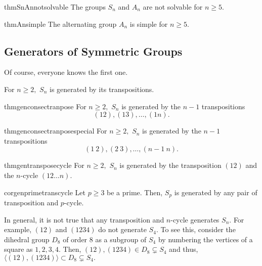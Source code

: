 \begin{restatable}[]{thm}{SnAnnotsolvable}
\label{thm:SnAnnotsolvable}
	The groups $S_n$ and $A_n$ are not solvable for $n \ge 5.$ \hfill\hyperref[thm:SnAnnotsolvable2]{\downsym}
\end{restatable}

\begin{restatable}[]{thm}{Ansimple}
\label{thm:Ansimple}
	The alternating group $A_n$ is simple for $n \ge 5.$ \hfill\hyperref[thm:Ansimple2]{\downsym}
\end{restatable}

\subsection{Generators of Symmetric Groups}

Of course, everyone knows the first one.

\begin{thm} \label{thm:gentranspose}
	For $n \ge 2,$ $S_n$ is generated by its transpositions.
\end{thm}

\begin{restatable}[]{thm}{genconsectranpose}
\label{thm:genconsectranpose}
	For $n \ge 2,$ $S_n$ is generated by the $n - 1$ transpositions
	\begin{equation*} 
		(12), (13), \ldots, (1n).
	\end{equation*} \hfill\hyperref[thm:genconsectranpose2]{\downsym}
\end{restatable}

\begin{restatable}[]{thm}{genconsectranposespecial}
\label{thm:genconsectranposespecial}
	For $n \ge 2,$ $S_n$ is generated by the $n - 1$ transpositions
	\begin{equation*} 
		(1 \ 2), (2 \ 3), \ldots, (n - 1 \ n).
	\end{equation*}  \hfill\hyperref[thm:genconsectranposespecial2]{\downsym}
\end{restatable}

\begin{restatable}[]{thm}{gentransposecycle}
\label{thm:gentransposecycle}
	For $n \ge 2,$ $S_n$ is generated by the transposition $(12)$ and the $n$-cycle $(12 \ldots n).$ \hfill\hyperref[thm:gentransposecycle2]{\downsym}
\end{restatable}

\begin{restatable}[]{cor}{genprimetranscycle}
\label{cor:genprimetranscycle}
	Let $p \ge 3$ be a prime. Then, $S_p$ is generated by any pair of transposition and $p$-cycle. \hfill\hyperref[cor:genprimetranscycle2]{\downsym}
\end{restatable}

\begin{rem}
	In general, it is not true that any transposition and $n$-cycle generates $S_n.$ For example, $(12)$ and $(1234)$ do not generate $S_4.$ To see this, consider the dihedral group $D_8$ of order $8$ as a subgroup of $S_4$ by numbering the vertices of a square as $1, 2, 3, 4.$ Then, $(12), (1234) \in D_8 \subsetneq S_4$ and thus, $\langle (12), (1234)\rangle \subset D_8 \subsetneq S_4.$
\end{rem}